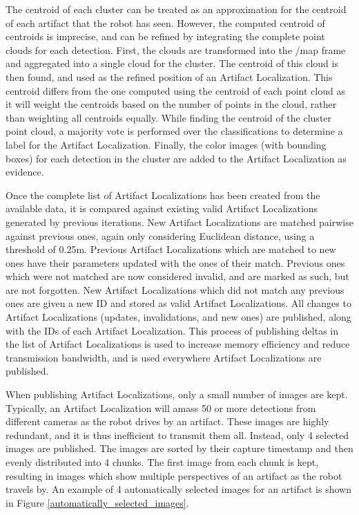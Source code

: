 The centroid of each cluster can be treated as an approximation for the centroid of each artifact that the robot has seen. However, the computed centroid of centroids is imprecise, and can be refined by integrating the complete point clouds for each detection. First, the clouds are transformed into the /map frame and aggregated into a single cloud for the cluster. The centroid of this cloud is then found, and used as the refined position of an Artifact Localization. This centroid differs from the one computed using the centroid of each point cloud as it will weight the centroids based on the number of points in the cloud, rather than weighting all centroids equally. While finding the centroid of the cluster point cloud, a majority vote is performed over the classifications to determine a label for the Artifact Localization. Finally, the color images (with bounding boxes) for each detection in the cluster are added to the Artifact Localization as evidence.
	
Once the complete list of Artifact Localizations has been created from the available data, it is compared against existing valid Artifact Localizations generated by previous iterations. New Artifact Localizations are matched pairwise against previous ones, again only considering Euclidean distance, using a threshold of 0.25m. Previous Artifact Localizations which are matched to new ones have their parameters updated with the ones of their match. Previous ones which were not matched are now considered invalid, and are marked as such, but are not forgotten. New Artifact Localizations which did not match any previous ones are given a new ID and stored as valid Artifact Localizations. All changes to Artifact Localizations (updates, invalidations, and new ones) are published, along with the IDs of each Artifact Localization. This process of publishing deltas in the list of Artifact Localizations is used to increase memory efficiency and reduce transmission bandwidth, and is used everywhere Artifact Localizations are published.
	
When publishing Artifact Localizations, only a small number of images are kept. Typically, an Artifact Localization will amass 50 or more detections from different cameras as the robot drives by an artifact. These images are highly redundant, and it is thus inefficient to transmit them all. Instead, only 4 selected images are published. The images are sorted by their capture timestamp and then evenly distributed into 4 chunks. The first image from each chunk is kept, resulting in images which show multiple perspectives of an artifact as the robot travels by. An example of 4 automatically selected images for an artifact is shown in Figure \ref{automatically_selected_images}.

